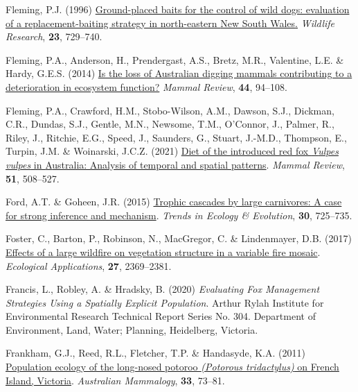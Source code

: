 \documentclass[11pt,a4paper,titlepage,twoside,openright]{style/unimelbthesis}
\newenvironment{CSLReferences}%
  {}%
  {\par}
\begin{document}
\begin{mainmatter}
\begin{CSLReferences}{1}{0}
\leavevmode{}%
Fleming, P.J. (1996) \href{https://doi.org/10.1071/WR9960729}{{Ground-placed baits for the control of wild dogs: evaluation of a replacement-baiting strategy in north-eastern {New South Wales}.}} \emph{Wildlife Research}, \textbf{23}, 729--740.

\leavevmode{}%
Fleming, P.A., Anderson, H., Prendergast, A.S., Bretz, M.R., Valentine, L.E. \& Hardy, G.E.S. (2014) \href{https://doi.org/10.1111/mam.12014}{Is the loss of {A}ustralian digging mammals contributing to a deterioration in ecosystem function?} \emph{Mammal Review}, \textbf{44}, 94--108.

\leavevmode{}%
Fleming, P.A., Crawford, H.M., Stobo-Wilson, A.M., Dawson, S.J., Dickman, C.R., Dundas, S.J., Gentle, M.N., Newsome, T.M., O'Connor, J., Palmer, R., Riley, J., Ritchie, E.G., Speed, J., Saunders, G., Stuart, J.-M.D., Thompson, E., Turpin, J.M. \& Woinarski, J.C.Z. (2021) \href{https://doi.org/10.1111/mam.12251}{Diet of the introduced red fox \emph{{V}ulpes vulpes} in {A}ustralia: Analysis of temporal and spatial patterns}. \emph{Mammal Review}, \textbf{51}, 508--527.

\leavevmode{}%
Ford, A.T. \& Goheen, J.R. (2015) \href{https://doi.org/10.1016/j.tree.2015.09.012}{Trophic cascades by large carnivores: A case for strong inference and mechanism}. \emph{Trends in Ecology \& Evolution}, \textbf{30}, 725--735.

\leavevmode{}%
Foster, C., Barton, P., Robinson, N., MacGregor, C. \& Lindenmayer, D.B. (2017) \href{https://doi.org/10.1002/eap.1614}{Effects of a large wildfire on vegetation structure in a variable fire mosaic}. \emph{Ecological Applications}, \textbf{27}, 2369--2381.

\leavevmode{}%
Francis, L., Robley, A. \& Hradsky, B. (2020) \emph{Evaluating Fox Management Strategies Using a Spatially Explicit Population}. Arthur Rylah Institute for Environmental Research Technical Report Series No. 304. Department of Environment, Land, Water; Planning, Heidelberg, Victoria.

\leavevmode{}%
Frankham, G.J., Reed, R.L., Fletcher, T.P. \& Handasyde, K.A. (2011) \href{https://doi.org/10.1071/AM10051}{Population ecology of the long-nosed potoroo \emph{({Potorous tridactylus})} on {French Island, Victoria}}. \emph{{A}ustralian Mammalogy}, \textbf{33}, 73--81.


\end{CSLReferences}
\end{mainmatter}
\end{document}
